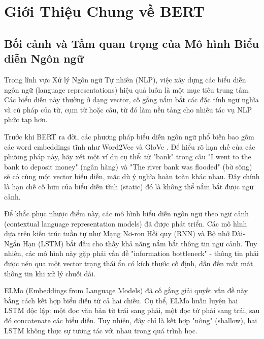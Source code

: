\section{Giới Thiệu Chung về BERT}
\label{sec:gioi_thieu_chung_bert}

\subsection{Bối cảnh và Tầm quan trọng của Mô hình Biểu diễn Ngôn ngữ}
\label{ssec:boi_canh_bieu_dien_ngon_ngu}
Trong lĩnh vực Xử lý Ngôn ngữ Tự nhiên (NLP), việc xây dựng các biểu diễn ngôn ngữ (language representations) hiệu quả luôn là một mục tiêu trung tâm. Các biểu diễn này thường ở dạng vector, cố gắng nắm bắt các đặc tính ngữ nghĩa và cú pháp của từ, cụm từ hoặc câu, từ đó làm nền tảng cho nhiều tác vụ NLP phức tạp hơn. 

Trước khi BERT ra đời, các phương pháp biểu diễn ngôn ngữ phổ biến bao gồm các word embeddings tĩnh như Word2Vec \cite{mikolov2013distributed} và GloVe \cite{pennington2014glove}. Để hiểu rõ hạn chế của các phương pháp này, hãy xét một ví dụ cụ thể: từ "bank" trong câu "I went to the bank to deposit money" (ngân hàng) và "The river bank was flooded" (bờ sông) sẽ có cùng một vector biểu diễn, mặc dù ý nghĩa hoàn toàn khác nhau. Đây chính là hạn chế cố hữu của biểu diễn tĩnh (static) đó là không thể nắm bắt được ngữ cảnh.

Để khắc phục nhược điểm này, các mô hình biểu diễn ngôn ngữ theo ngữ cảnh (contextual language representation models) đã được phát triển. Các mô hình dựa trên kiến trúc tuần tự như Mạng Nơ-ron Hồi quy (RNN) và Bộ nhớ Dài-Ngắn Hạn (LSTM) bắt đầu cho thấy khả năng nắm bắt thông tin ngữ cảnh. Tuy nhiên, các mô hình này gặp phải vấn đề "information bottleneck" - thông tin phải được nén qua một vector trạng thái ẩn có kích thước cố định, dẫn đến mất mát thông tin khi xử lý chuỗi dài.

ELMo (Embeddings from Language Models) \cite{peters2018deep} đã cố gắng giải quyết vấn đề này bằng cách kết hợp biểu diễn từ cả hai chiều. Cụ thể, ELMo huấn luyện hai LSTM độc lập: một đọc văn bản từ trái sang phải, một đọc từ phải sang trái, sau đó concatenate các biểu diễn. Tuy nhiên, đây chỉ là kết hợp "nông" (shallow), hai LSTM không thực sự tương tác với nhau trong quá trình học.


